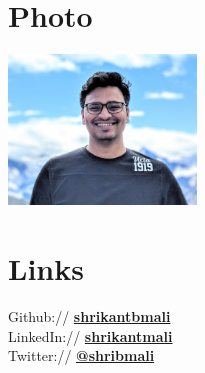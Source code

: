 \documentclass[]{shrikant-resume-openfont}
\begin{document}
%
%
\lastupdated

%
%

%
%

\begin{minipage}[t]{0.33\textwidth} 

\section{Photo}
\includegraphics[height=4cm]{photo.jpg} \\

\section{Links} 
Github:// \href{https://github.com/shrikantbmali}{\bf shrikantbmali} \\
LinkedIn://  \href{https://www.linkedin.com/in/shrikantmali/}{\bf shrikantmali} \\
Twitter://  \href{https://twitter.com/shribmali}{\bf @shribmali} \\



\end{minipage}
\end{document}
